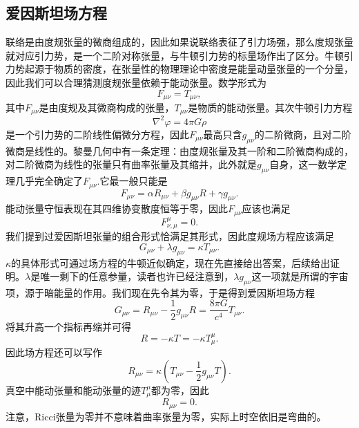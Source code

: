 \documentclass[11pt, a4paper, oneside, onecolumn]{ctexart}
\numberwithin{equation}{subsection}
\begin{document}
\subsection{爱因斯坦场方程}
联络是由度规张量的微商组成的，因此如果说联络表征了引力场强，那么度规张量就对应引力势，是一个二阶对称张量，与牛顿引力势的标量场作出了区分。牛顿引力势起源于物质的密度，在张量性的物理理论中密度是能量动量张量的一个分量，因此我们可以合理猜测度规张量依赖于能动张量。数学形式为
\begin{equation}
F_{\mu\nu}=T_{\mu\nu},
\end{equation}
其中$F_{\mu\nu}$是由度规及其微商构成的张量，$T_{\mu\nu}$是物质的能动张量。其次牛顿引力方程
\begin{equation}
\nabla^{2}\varphi=4\pi G\rho
\end{equation}
是一个引力势的二阶线性偏微分方程，因此$F_{\mu\nu}$最高只含$g_{\mu\nu}$的二阶微商，且对二阶微商是线性的。黎曼几何中有一条定理：由度规张量及其一阶和二阶微商构成的，对二阶微商为线性的张量只有曲率张量及其缩并，此外就是$g_{\mu\nu}$自身，这一数学定理几乎完全确定了$F_{\mu\nu}$.它最一般只能是
\begin{equation}
F_{\mu\nu}=\alpha R_{\mu\nu}+\beta g_{\mu\nu}R+\gamma g_{\mu\nu}.
\end{equation}
能动张量守恒表现在其四维协变散度恒等于零，因此$F_{\mu\nu}$应该也满足
\begin{equation}
F^{\mu}_{\nu,\mu}=0.
\end{equation}
我们提到过爱因斯坦张量的组合形式恰满足其形式，因此度规场方程应该满足
\begin{equation}
G_{\mu\nu}+\lambda g_{\mu\nu}=\kappa T_{\mu\nu}.
\end{equation}
$\kappa$的具体形式可通过场方程的牛顿近似确定，现在先直接给出答案，后续给出证明。$\lambda$是唯一剩下的任意参量，读者也许已经注意到，$\lambda g_{\mu\nu}$这一项就是所谓的宇宙项，源于暗能量的作用。我们现在先令其为零，于是得到爱因斯坦场方程
\begin{equation}
G_{\mu\nu}=R_{\mu\nu}-\frac12g_{\mu\nu}R=\frac{8\pi G}{c^{4}}T_{\mu\nu}.
\end{equation}
将其升高一个指标再缩并可得
\begin{equation}
R=-\kappa T=-\kappa T^{\mu}_{\mu}.
\end{equation}
因此场方程还可以写作
\begin{equation}
R_{\mu\nu}=\kappa\left(T_{\mu\nu}-\frac12g_{\mu\nu}T\right).
\end{equation}
真空中能动张量和能动张量的迹$T^{\mu}_{\mu}$都为零，因此
\begin{equation}
R_{\mu\nu}=0.
\end{equation}
注意，Ricci张量为零并不意味着曲率张量为零，实际上时空依旧是弯曲的。
\end{document}
